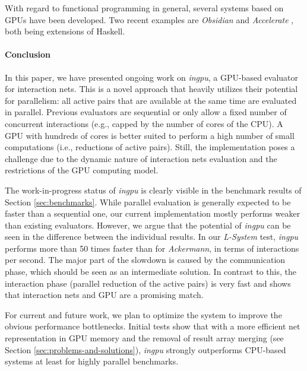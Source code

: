 \documentclass[submission,copyright,creativecommons]{eptcs}
\begin{document}
With regard to functional programming in general, several systems based on GPUs
have been developed. Two recent examples are \emph{Obsidian}
\cite{DBLP:journals/procedia/SvenssonCS10} and \emph{Accelerate}
\cite{DBLP:conf/popl/ChakravartyKLMG11}, both being extensions of Haskell.

\paragraph{\textbf{Conclusion}}
In this paper, we have presented ongoing work on \emph{ingpu}, a
GPU-based evaluator for interaction nets. This is a novel approach that heavily
utilizes their potential for parallelism: all active pairs that are available at
the same time are evaluated in parallel. Previous evaluators are sequential or only
allow a fixed number of concurrent interactions (e.g., capped by the number of
cores of the CPU). A GPU with hundreds of cores is better suited to perform a
high number of small computations (i.e., reductions of active pairs).
Still, the implementation poses a challenge due to the dynamic nature of
interaction nets evaluation and the restrictions of the GPU computing model.

The work-in-progress status of \emph{ingpu} is clearly visible in the benchmark
results of Section \ref{sec:benchmarks}. While parallel evaluation is
generally expected to be faster than a sequential one, our current
implementation mostly performs weaker than existing evaluators. However, we
argue that the potential of \emph{ingpu} can be seen in the difference between
the individual results. In our \emph{L-System} test, \emph{ingpu} performs more
than 50 times faster than for \emph{Ackermann}, in terms of interactions per
second. The major part of the slowdown is caused by the communication phase,
which should be seen as an intermediate solution. In contrast to this, the
interaction phase (parallel reduction of the active pairs) is very fast and
shows that interaction nets and GPU are a promising match.

For current and future work, we plan to
optimize the system to improve the obvious performance bottlenecks.
Initial tests show that with a more efficient net representation in GPU memory
and the removal of result array merging (see Section
\ref{sec:problems-and-solutions}), \emph{ingpu} strongly outperforms CPU-based
systems at least for highly parallel benchmarks.




\end{document}

